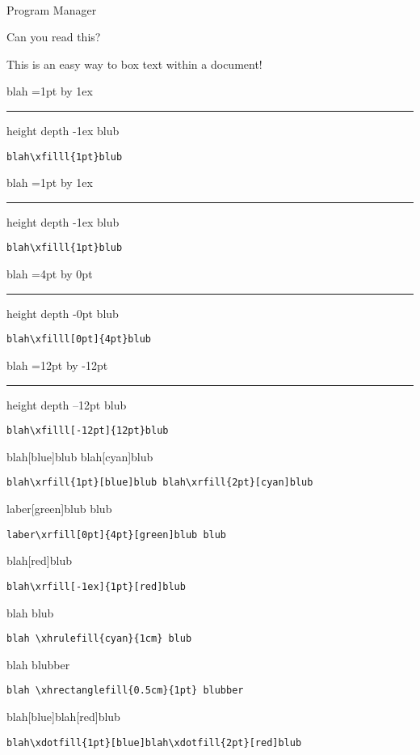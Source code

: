 \documentclass{report}
\makeatletter
\renewcommand{\hrulefill}{\leavevmode\leaders\hrule height 1pt\hfill\kern\z@}
\newcommand{\xfilll}[2][1ex]{%
  \dimen0=#2\advance\dimen0 by #1%
  \leaders\hrule height \dimen0 depth -#1\hfill%
}
\makeatother
\begin{document}
\vspace{.2in}
\makebox[2.5in]{\hrulefill} \hspace {1.0in}\makebox[2.5in]{\hrulefill} \\
Program Manager  \

 \par

 \par

 \par

 \par


Can you read this?

\begin{framed}
This is an easy way to box text within a document!
\end{framed}

blah\xfilll{1pt}blub
\begin{lstlisting}
blah\xfilll{1pt}blub
\end{lstlisting}
blah\xfilll{1pt}blub
\begin{lstlisting}
blah\xfilll{1pt}blub
\end{lstlisting}

blah\xfilll[0pt]{4pt}blub
\begin{lstlisting}
blah\xfilll[0pt]{4pt}blub
\end{lstlisting}

blah\xfilll[-12pt]{12pt}blub
\begin{lstlisting}
blah\xfilll[-12pt]{12pt}blub
\end{lstlisting}

blah\xrfill{1pt}[blue]blub blah\xrfill{2pt}[cyan]blub
\begin{lstlisting}
blah\xrfill{1pt}[blue]blub blah\xrfill{2pt}[cyan]blub
\end{lstlisting}

laber\xrfill[0pt]{4pt}[green]blub blub
\begin{lstlisting}
laber\xrfill[0pt]{4pt}[green]blub blub
\end{lstlisting}

blah\xrfill[-1ex]{1pt}[red]blub
\begin{lstlisting}
blah\xrfill[-1ex]{1pt}[red]blub
\end{lstlisting}

blah  blub
\begin{lstlisting}
blah \xhrulefill{cyan}{1cm} blub
\end{lstlisting}

blah \xhrectanglefill{0.5cm}{1pt} blubber
\begin{lstlisting}
blah \xhrectanglefill{0.5cm}{1pt} blubber
\end{lstlisting}

blah\xdotfill{1pt}[blue]blah\xdotfill{2pt}[red]blub
\begin{lstlisting}
blah\xdotfill{1pt}[blue]blah\xdotfill{2pt}[red]blub
\end{lstlisting}
\end{document}
